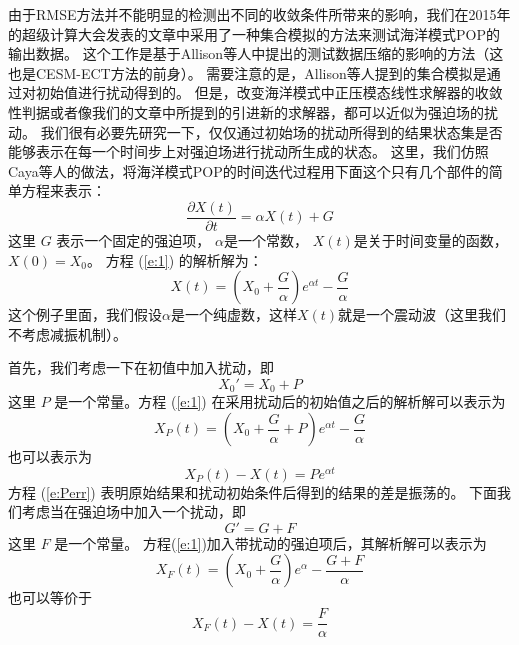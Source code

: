 由于RMSE方法并不能明显的检测出不同的收敛条件所带来的影响，我们在2015年的超级计算大会发表的文章中采用了一种集合模拟的方法来测试海洋模式POP的输出数据\cite{yong2015}。 
这个工作是基于Allison等人\cite{baker2014methodology}中提出的测试数据压缩的影响的方法（这也是CESM-ECT方法的前身）。
需要注意的是，Allison等人提到的集合模拟是通过对初始值进行扰动得到的。 
但是，改变海洋模式中正压模态线性求解器的收敛性判据或者像我们的文章\cite{yong2015}中所提到的引进新的求解器，都可以近似为强迫场的扰动。 
我们很有必要先研究一下，仅仅通过初始场的扰动所得到的结果状态集是否能够表示在每一个时间步上对强迫场进行扰动所生成的状态。
这里，我们仿照Caya等人\cite{caya1998}的做法，将海洋模式POP的时间迭代过程用下面这个只有几个部件的简单方程来表示：
\begin{equation}
\frac{\partial X(t)}{\partial t} = \alpha X(t) +G
\label{e:1}
\end{equation}
这里 $G$ 表示一个固定的强迫项，  $\alpha$是一个常数，  $X(t)$是关于时间变量的函数， $X(0) = X_0$。 
方程 (\ref{e:1}) 的解析解为：
\begin{equation}
X(t) = (X_0 +\frac{G}{\alpha})e^{\alpha t } -\frac{G}{\alpha}
\label{e:2}
\end{equation}
这个例子里面，我们假设$\alpha$是一个纯虚数，这样$X(t)$就是一个震动波（这里我们不考虑减振机制）。 

 
首先，我们考虑一下在初值中加入扰动，即
\begin{equation*}
X_0' =X_0+P
\end{equation*}
这里 $P$ 是一个常量。方程 (\ref{e:1}) 在采用扰动后的初始值之后的解析解可以表示为 
\begin{equation}
X_P(t) = (X_0+\frac{G}{\alpha}+P)e^{\alpha t } -\frac{G}{\alpha}
\label{e:Pan}
\end{equation}
也可以表示为
\begin{equation}
X_P(t)-X(t) = Pe^{\alpha t }
\label{e:Perr}
\end{equation}
方程 (\ref{e:Perr}) 表明原始结果和扰动初始条件后得到的结果的差是振荡的。
下面我们考虑当在强迫场中加入一个扰动，即
\begin{equation*}
G' = G + F
\end{equation*}
这里 $F$ 是一个常量。  方程(\ref{e:1})加入带扰动的强迫项后，其解析解可以表示为
\begin{equation}
X_F(t) = (X_0 +\frac{G}{\alpha})e^{\alpha } -\frac{G+F}{\alpha}
\label{e:Fan}
\end{equation}
也可以等价于
\begin{equation}
X_F(t)-X(t) = \frac{F}{\alpha} 
\label{e:Ferr}
\end{equation}


